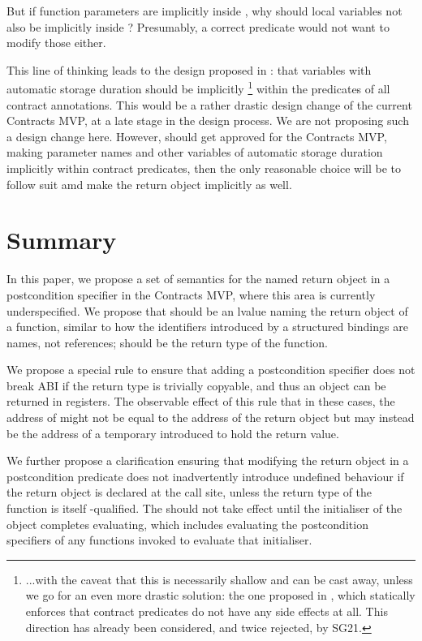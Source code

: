 But if function parameters are implicitly  inside , why should local variables not also be implicitly  inside ? Presumably, a correct predicate would not want to modify those either. 

This line of thinking leads to the design proposed in \cite{P3071R0}: that variables with automatic storage duration should be implicitly \footnote{...with the caveat that this  is necessarily shallow and can be cast away, unless we go for an even more drastic solution: the one proposed in \cite{P2680R1}, which statically enforces that contract predicates do not have any side effects at all. This direction has already been considered, and twice rejected, by SG21.} within the predicates of all contract annotations.  This would be a rather drastic design change of the current Contracts MVP, at a late stage in the design process. We are not proposing such a design change here. However, should  \cite{P3071R0} get approved for the Contracts MVP, making parameter names and other variables of automatic storage duration implicitly  within contract predicates, then the only reasonable choice will be to follow suit amd make the return object implicitly  as well.

\section{Summary}

In this paper, we propose a set of semantics for the named return object  in a postcondition specifier  in the Contracts MVP, where this area is currently underspecified. We propose that  should be an lvalue naming the return object of a function, similar to how the identifiers introduced by a structured bindings are names, not references;  should be the return type of the function.

We propose a special rule to ensure that adding a postcondition specifier does not break ABI if the return type is trivially copyable, and thus an object can be returned in registers. The observable effect of this rule that in these cases, the address of  might not be equal to the address of the return object but may instead be the address of a temporary introduced to hold the return value.

We further propose a clarification ensuring that modifying the return object in a postcondition predicate does not inadvertently introduce undefined behaviour if the return object is declared  at the call site, unless the return type of the function is itself -qualified. The  should not take effect until the initialiser of the object completes evaluating, which includes evaluating the postcondition specifiers of any functions invoked to evaluate that initialiser.

